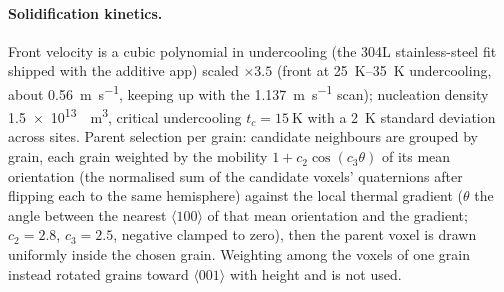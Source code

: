 \documentclass[11pt,a4paper]{article}
\newcommand{\dir}[1]{$\langle #1 \rangle$}
\begin{document}
\paragraph{Solidification kinetics.} Front velocity is a cubic polynomial in undercooling (the 304L stainless-steel fit shipped with the additive app) scaled $\times 3.5$ (front at \SIrange{25}{35}{\kelvin} undercooling, about \SI{0.56}{\metre\per\second}, keeping up with the \SI{1.137}{\metre\per\second} scan); nucleation density \SI{1.5e13}{\per\cubic\metre}, critical undercooling $t_c = \SI{15}{\kelvin}$ with a \SI{2}{\kelvin} standard deviation across sites. Parent selection per grain: candidate neighbours are grouped by grain, each grain weighted by the mobility $1 + c_2 \cos(c_3 \theta)$ of its mean orientation (the normalised sum of the candidate voxels' quaternions after flipping each to the same hemisphere) against the local thermal gradient ($\theta$ the angle between the nearest \dir{100} of that mean orientation and the gradient; $c_2 = 2.8$, $c_3 = 2.5$, negative clamped to zero), then the parent voxel is drawn uniformly inside the chosen grain. Weighting among the voxels of one grain instead rotated grains toward \dir{001} with height and is not used.
\end{document}
